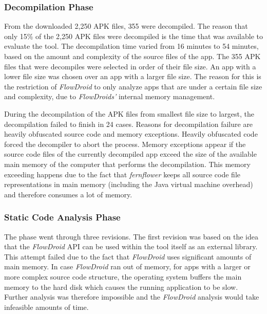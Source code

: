 \subsubsection{Decompilation Phase}

From the downloaded 2,250 APK files, 355 were decompiled. 
The reason that only 15\% of the 2,250 APK files were decompiled is the time that was available to evaluate the tool.
The decompilation time varied from 16 minutes to 54 minutes, based on the amount and complexity of the source files of the app.
The 355 APK files that were decompiles were selected in order of their file size.
An app with a lower file size was chosen over an app with a larger file size.
The reason for this is the restriction of \textit{FlowDroid} to only analyze apps that are under a certain file size and complexity, due to \textit{FlowDroids'} internal memory management.

During the decompilation of the APK files from smallest file size to largest, the decompilation failed to finish in 24 cases.
Reasons for decompilation failure are heavily obfuscated source code and memory exceptions.
Heavily obfuscated code forced the decompiler to abort the process.
Memory exceptions appear if the source code files of the currently decompiled app exceed the size of the available main memory of the computer that performs the decompilation.
This memory exceeding happens due to the fact that \textit{fernflower} keeps all source code file representations in main memory (including the Java virtual machine overhead) and therefore consumes a lot of memory.

\subsubsection{Static Code Analysis Phase}

The \sca phase went through three revisions. 
The first revision was based on the idea that the \textit{FlowDroid} \acs{API} can be used within the \AIPRAT tool itself as an external library.
This attempt failed due to the fact that \textit{FlowDroid} uses significant amounts of main memory.
In case \textit{FlowDroid} ran out of memory, for apps with a larger or more complex source code structure, the operating system buffers the main memory to the hard disk which causes the running application to be slow.
Further analysis was therefore impossible and the \textit{FlowDroid} analysis would take infeasible amounts of time.

